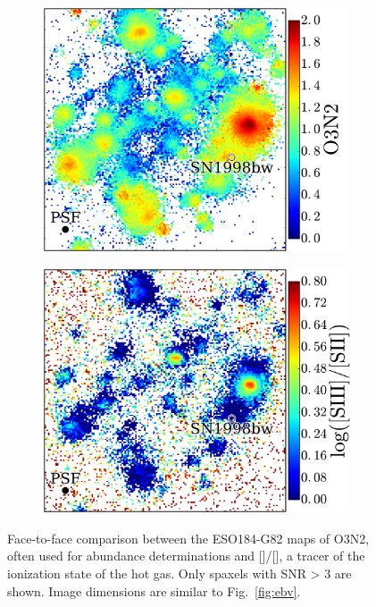 \documentclass[traditabstract, referee]{aa}
\newcommand{\sii}{[\ion{S}{ii}]}
\newcommand{\siii}{[\ion{S}{iii}]}
\begin{document}
\begin{figure}
\centering
\begin{subfigure}{.42\textwidth}
  \includegraphics[width=0.999\linewidth]{Figs/MUSE_SN1998bw_O3N2.pdf}
\end{subfigure}
\begin{subfigure}{.42\textwidth}
  \includegraphics[width=0.999\linewidth]{Figs/MUSE_SN1998bw_S3S2.pdf}
\end{subfigure}
\caption{Face-to-face comparison between the ESO184-G82 maps of O3N2, often used for abundance determinations and \siii/\sii, a tracer of the ionization state of the hot gas. Only spaxels with {SNR > 3} are shown. Image dimensions are similar to Fig.~\ref{fig:ebv}.}
\label{fig:s3s2}
\end{figure}
\end{document}
